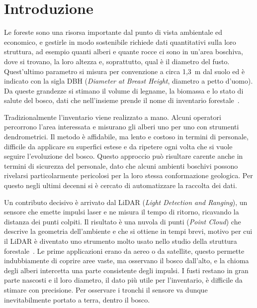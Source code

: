 \chapter*{Introduzione}

Le foreste sono una risorsa importante dal punto di vista ambientale ed economico, e gestirle in modo sostenibile richiede dati quantitativi sulla loro struttura, ad esempio quanti alberi e quante rocce ci sono in un'area boschiva, dove si trovano, la loro altezza e, soprattutto, qual è il diametro del fusto. Quest'ultimo parametro si misura per convenzione a circa 1,3~m dal suolo ed è indicato con la sigla DBH (\textit{Diameter at Breast Height}, diametro a petto d'uomo). Da queste grandezze si stimano il volume di legname, la biomassa e lo stato di salute del bosco, dati che nell'insieme prende il nome di inventario forestale~\cite{hamilton1975}.

Tradizionalmente l'inventario viene realizzato a mano. Alcuni operatori percorrono l'area interessata e misurano gli alberi uno per uno con strumenti dendrometrici. Il metodo è affidabile, ma lento e costoso in termini di personale, difficile da applicare su superfici estese e da ripetere ogni volta che si vuole seguire l'evoluzione del bosco. Questo approccio può risultare carente anche in termini di sicurezza del personale, dato che alcuni ambienti boschivi possono rivelarsi particolarmente pericolosi per la loro stessa conformazione geologica. Per questo negli ultimi decenni si è cercato di automatizzare la raccolta dei dati.

Un contributo decisivo è arrivato dal LiDAR (\textit{Light Detection and Ranging}), un sensore che emette impulsi laser e ne misura il tempo di ritorno, ricavando la distanza dei punti colpiti. Il risultato è una nuvola di punti (\textit{Point Cloud}) che descrive la geometria dell'ambiente e che si ottiene in tempi brevi, motivo per cui il LiDAR è diventato uno strumento molto usato nello studio della struttura forestale~\cite{lim2003}. Le prime applicazioni erano da aereo o da satellite, questo permette indubbiamente di coprire aree vaste, ma osservano il bosco dall'alto, e la chioma degli alberi intercetta una parte consistente degli impulsi. I fusti restano in gran parte nascosti e il loro diametro, il dato più utile per l'inventario, è difficile da stimare con precisione. Per osservare i tronchi il sensore va dunque inevitabilmente portato a terra, dentro il bosco.

